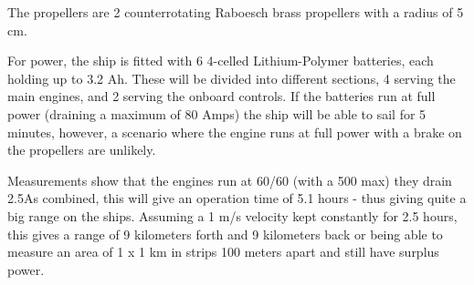 The propellers are 2 counterrotating Raboesch brass propellers with a radius of 5 cm. 

For power, the ship is fitted with 6 4-celled Lithium-Polymer batteries, each holding up to 3.2 Ah. These will be divided into different sections, 4 serving the main engines, and 2 serving the onboard controls. If the batteries run at full power (draining a maximum of 80 Amps) the ship will be able to sail for 5 minutes, however, a scenario where the engine runs at full power with a brake on the propellers are unlikely.

Measurements show that the engines run at 60/60 (with a 500 max) they drain 2.5As combined, this will give an operation time of 5.1 hours - thus giving quite a big range on the ships. Assuming a 1 m/s velocity kept constantly for 2.5 hours, this gives a range of 9 kilometers forth and 9 kilometers back or being able to measure an area of 1 x 1 km in strips 100 meters apart and still have surplus power.